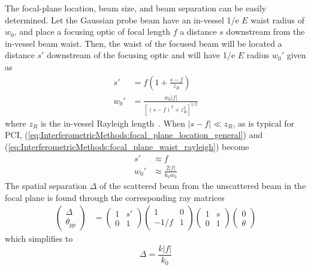 The focal-plane location, beam size, and beam separation
can be easily determined.
Let the Gaussian probe beam have
an in-vessel 1/e $E$ waist radius of $w_0$,
and place a focusing optic of focal length $f$
a distance $s$ downstream from the in-vessel beam waist.
Then, the waist of the focused beam
will be located a distance $s'$ downstream of the focusing optic
and will have 1/e $E$ radius $w_0'$ given as
\begin{align}
  s' &= f \left( 1 + \frac{s - f}{z_R} \right)
  \label{eq:InterferometricMethods:focal_plane_location_general}
  \\
  w_0' &= \frac{w_0 |f|}{\left[ (s - f)^2 + z_R^2 \right]^{1/2}}
  \label{eq:InterferometricMethods:focal_plane_waist_general}
\end{align}
where $z_R$ is the in-vessel Rayleigh length~\cite{self83}.
When $|s - f| \ll z_R$, as is typical for PCI,
(\ref{eq:InterferometricMethods:focal_plane_location_general}) and
(\ref{eq:InterferometricMethods:focal_plane_waist_rayleigh}) become
\graffito{\textcolor{red}{%
  Simple optics gives correct $s'$, but
  Gaussian beam physics needed for $w_0'$}
}%
\begin{align}
  s' &\approx f
  \label{eq:InterferometricMethods:focal_plane_location_rayleigh}
  \\
  w_0' &\approx \frac{2 |f|}{k_0 w_0}
  \label{eq:InterferometricMethods:focal_plane_waist_rayleigh}
\end{align}
The spatial separation $\Delta$
of the scattered beam from the unscattered beam
in the focal plane is found through the corresponding ray matrices
\begin{align}
  \begin{pmatrix}
    \Delta
    \\
    \theta_{pp}
  \end{pmatrix}
  &=
  \begin{pmatrix}
    1 & s'
    \\
    0 & 1
  \end{pmatrix}
  \begin{pmatrix}
    1      & 0
    \\
    -1 / f & 1
  \end{pmatrix}
  \begin{pmatrix}
    1 & s
    \\
    0 & 1
  \end{pmatrix}
  \begin{pmatrix}
    0
    \\
    \theta
  \end{pmatrix}
\end{align}
which simplifies to
\begin{equation}
  \Delta
  =
  \frac{k |f|}{k_0}
  \label{eq:InterferometricMethods:phase_plate_beam_separation}
\end{equation}


